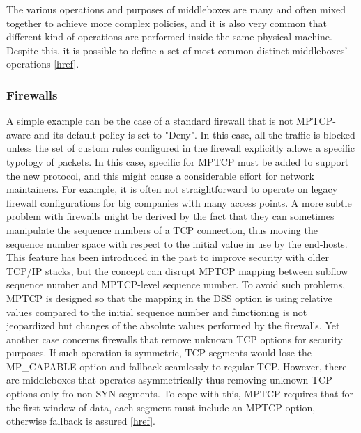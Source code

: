 The various operations and purposes of middleboxes are many and often mixed together to achieve more complex policies, and it is also very common that different kind of operations are performed inside the same physical machine. Despite this, it is possible to define a set of most common distinct middleboxes' operations [\href{https://queue.acm.org/detail.cfm?id=2591369}{href}]. 

\subsubsection{Firewalls}
A simple example can be the case of a standard firewall that is not MPTCP-aware and its default policy is set to "Deny". In this case, all the traffic is blocked unless the set of custom rules configured in the firewall explicitly allows a specific typology of packets. In this case, specific for MPTCP must be added to support the new protocol, and this might cause a considerable effort for network maintainers. For example, it is often not straightforward to operate on legacy firewall configurations for big companies with many access points.
A more subtle problem with firewalls might be derived by the fact that they can sometimes manipulate the sequence numbers of a TCP connection, thus moving the sequence number space with respect to the initial value in use by the end-hosts. This feature has been introduced in the past to improve security with older TCP/IP stacks, but the concept can disrupt MPTCP mapping between subflow sequence number and MPTCP-level sequence number. To avoid such problems, MPTCP is designed so that the mapping in the DSS option is using relative values compared to the initial sequence number and functioning is not jeopardized but changes of the absolute values performed by the firewalls.
Yet another case concerns firewalls that remove unknown TCP options for security purposes. If such operation is symmetric, TCP segments would lose the MP\_CAPABLE option and fallback seamlessly to regular TCP. However, there are middleboxes that operates asymmetrically thus removing unknown TCP options only fro non-SYN segments. To cope with this, MPTCP requires that for the first window of data, each segment must include an MPTCP option, otherwise fallback is assured [\href{http://conferences.sigcomm.org/co-next/2013/workshops/HotMiddlebox/program/p37.pdf}{href}].

